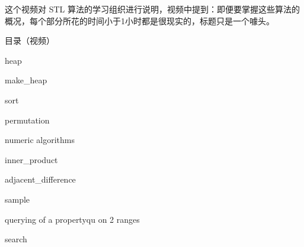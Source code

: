 这个视频对 S\+TL 算法的学习组织进行说明，视频中提到：即便要掌握这些算法的概况，每个部分所花的时间小于1小时都是很现实的，标题只是一个噱头。

目录（视频）


\begin{DoxyItemize}
\item heap
\begin{DoxyItemize}
\item make\+\_\+heap
\end{DoxyItemize}
\item sort
\item permutation
\item numeric algorithms
\begin{DoxyItemize}
\item inner\+\_\+product
\item adjacent\+\_\+difference
\item sample
\end{DoxyItemize}
\item querying of a propertyqu on 2 ranges
\item search
\item 
\end{DoxyItemize}